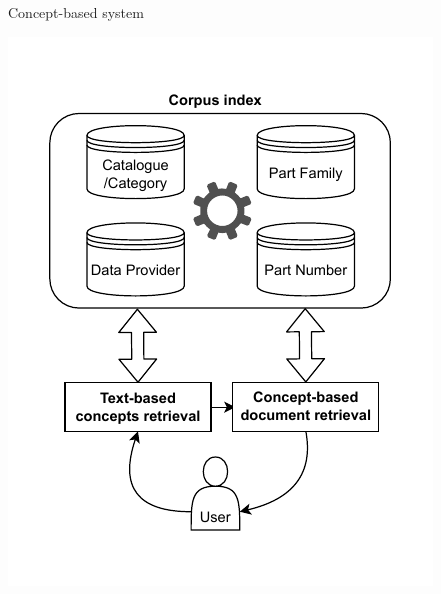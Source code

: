
\begin{frame}{Concept-based system}

        \begin{center}
            \includegraphics[scale=0.8]{images/tp-expe-concept-based-sys.pdf} 
        \end{center}

\end{frame}

